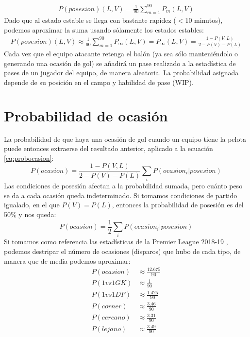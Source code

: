 \documentclass[a4paper,9pt]{article}
\begin{document}
\begin{align}
	P(posesion)(L,V)=\frac{1}{90}\sum_{m=1}^{90}P_m(L,V)
\end{align}
Dado que al estado estable se llega con bastante rapidez ($<10$ minutos), podemos aproximar la suma usando sólamente los estados estables:
\begin{align}
	P(posesion)(L,V)\approx\frac{1}{90}\sum_{m=1}^{90}P_\infty(L,V)=P_\infty(L,V)=\frac{1-P(V,L)}{2-P(V)-P(L)}
\end{align}
Cada vez que el equipo atacante retenga el balón (ya sea sólo manteniéndolo o generando una ocasión de gol) se añadirá un pase realizado a la estadística de pases de un jugador del equipo, de manera aleatoria. La probabilidad asignada depende de su posición en el campo y habilidad de pase (WIP).


\section{Probabilidad de ocasión}\label{sec:ProbOcasion}
\def \Pocasion {\ensuremath{\frac{12.675}{90}}}
\def \PvsGK {\ensuremath{\frac{1}{90}}}
\def \PvsDF {\ensuremath{\frac{1.425}{90}}}
\def \Pcorner {\ensuremath{\frac{3.46}{90}}}
\def \Pclose {\ensuremath{\frac{3.31}{90}}}
\def \Pfar {\ensuremath{\frac{3.49}{90}}}
La probabilidad de que haya una ocasión de gol cuando un equipo tiene la pelota puede entonces extraerse del resultado anterior, aplicado a la ecuación \ref{eq:probocasion}:
\begin{equation}\label{eq:probocasion2}
	P(ocasion)=\frac{1-P(V,L)}{2-P(V)-P(L)}\sum_i{P(ocasion_i|posesion)}
\end{equation}
Las condiciones de posesión afectan a la probabilidad sumada, pero cuánto peso se da a cada ocasión queda indeterminado. Si tomamos condiciones de partido igualado, en el que $P(V)=P(L)$, entonces la probabilidad de posesión es del 50\% y nos queda:
\begin{equation}
	P(ocasion)=\frac{1}{2}\sum_i{P(ocasion_i|posesion)}
\end{equation}
Si tomamos como referencia las estadísticas de la Premier League 2018-19 \cite{PremierLeague}, podemos destripar el número de ocasiones (disparos) que hubo de cada tipo, de manera que de media podemos aproximar:
\begin{align}
	P(ocasion)&\approx\Pocasion\\
	P(1vs1GK)&\approx\PvsGK\\
	P(1vs1DF)&\approx\PvsDF\\
	P(corner)&\approx\Pcorner\\
	P(cercano)&\approx\Pclose\\
	P(lejano)&\approx\Pfar
\end{align}
\end{document}
